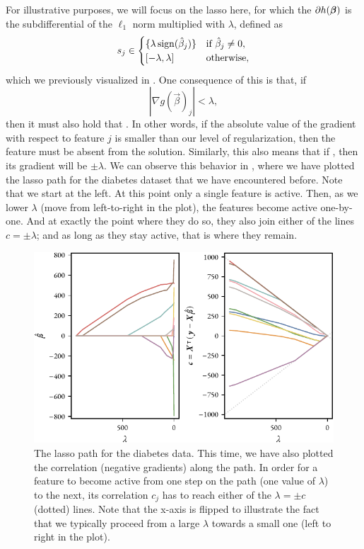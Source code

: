 For illustrative purposes, we will focus on the lasso here, for which the \(\partial h(\boldsymbol{\beta})\) is the subdifferential of the \(\ell_1\) norm multiplied with \(\lambda\), defined as
\[
  s_j \in
  \begin{cases}
    \{
    \lambda\operatorname{sign}(\hat\beta_j)\} & \text{if } \hat\beta_j \neq 0, \\
    [-\lambda, \lambda]         & \text{otherwise},
  \end{cases}
\]
which we previously visualized in .
One consequence of this is that, if
\begin{equation*}
  |\nabla g(\vec{\beta})_j| < \lambda,
\end{equation*}
then it must also hold that . In other words, if the absolute value of the gradient with respect to feature \(j\) is smaller than our level of regularization, then the feature must be absent from the solution. Similarly, this also means that if , then its gradient will be \(\pm \lambda\). We can observe this behavior in , where we have plotted the lasso path for the diabetes dataset that we have encountered before. Note that we start at the left. At this point only a single feature is active. Then, as we lower \(\lambda\) (move from left-to-right in the plot), the features become active one-by-one. And at exactly the point where they do so, they also join either of the lines \(c = \pm \lambda\); and as long as they stay active, that is where they remain.

\begin{figure}[htpb]
  \centering
  \includegraphics[]{figures/cor-coef-lasso-path.pdf}
  \caption{%
    The lasso path for the diabetes data. This time, we have also plotted the correlation (negative gradients) along the path. In order for a feature to become active from one step on the path (one value of \(\lambda\)) to the next, its correlation \(c_j\) has to reach either of the \(\lambda = \pm c\) (dotted) lines. Note that the x-axis is flipped to illustrate the fact that we typically proceed from a large \(\lambda\) towards a small one (left to right in the plot).
  }
  \label{fig:cor-coef-lasso-path}
\end{figure}

